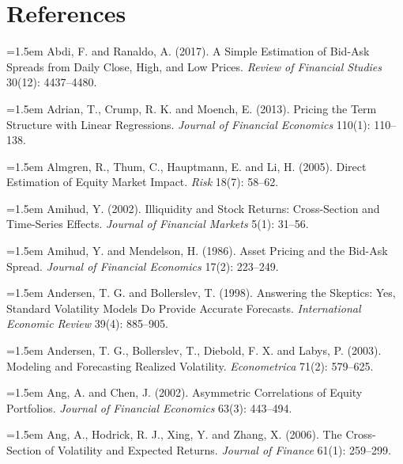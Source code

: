 \chapter*{References}
\label{references}

\begingroup
\footnotesize               %
\sloppy
\setlength{\parindent}{0pt}
\setlength{\parskip}{1pt}   %

\hangindent=1.5em Abdi, F. and Ranaldo, A. (2017). A Simple Estimation of Bid-Ask Spreads from Daily Close, High, and Low Prices. \emph{Review of Financial Studies} 30(12): 4437--4480.

\hangindent=1.5em Adrian, T., Crump, R. K. and Moench, E. (2013). Pricing the Term Structure with Linear Regressions. \emph{Journal of Financial Economics} 110(1): 110--138.

\hangindent=1.5em Almgren, R., Thum, C., Hauptmann, E. and Li, H. (2005). Direct Estimation of Equity Market Impact. \emph{Risk} 18(7): 58--62.

\hangindent=1.5em Amihud, Y. (2002). Illiquidity and Stock Returns: Cross-Section and Time-Series Effects. \emph{Journal of Financial Markets} 5(1): 31--56.

\hangindent=1.5em Amihud, Y. and Mendelson, H. (1986). Asset Pricing and the Bid-Ask Spread. \emph{Journal of Financial Economics} 17(2): 223--249.

\hangindent=1.5em Andersen, T. G. and Bollerslev, T. (1998). Answering the Skeptics: Yes, Standard Volatility Models Do Provide Accurate Forecasts. \emph{International Economic Review} 39(4): 885--905.

\hangindent=1.5em Andersen, T. G., Bollerslev, T., Diebold, F. X. and Labys, P. (2003). Modeling and Forecasting Realized Volatility. \emph{Econometrica} 71(2): 579--625.

\hangindent=1.5em Ang, A. and Chen, J. (2002). Asymmetric Correlations of Equity Portfolios. \emph{Journal of Financial Economics} 63(3): 443--494.

\hangindent=1.5em Ang, A., Hodrick, R. J., Xing, Y. and Zhang, X. (2006). The Cross-Section of Volatility and Expected Returns. \emph{Journal of Finance} 61(1): 259--299.


